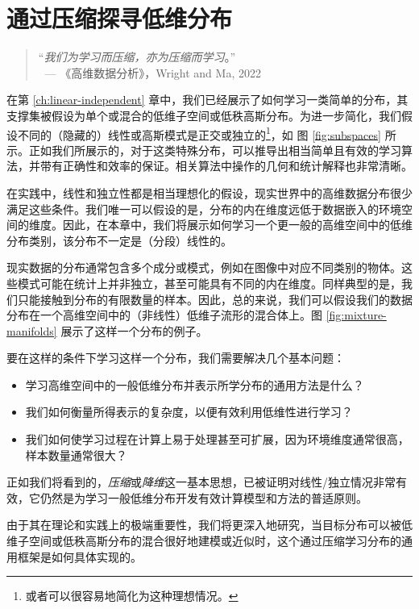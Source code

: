 \documentclass[../../book-main_zh.tex]{subfiles}
\begin{document}
\chapter{通过压缩探寻低维分布}
\label{ch:compression}\label{ch:general-distribution}

\begin{quote}
	\hfill    “{\em 我们为学习而压缩，亦为压缩而学习}。”\\
	$~$ \hfill --- 《高维数据分析》，Wright and Ma, 2022
\end{quote}
\vspace{5mm}

在第 \ref{ch:linear-independent} 章中，我们已经展示了如何学习一类简单的分布，其支撑集被假设为单个或混合的低维子空间或低秩高斯分布。为进一步简化，我们假设不同的（隐藏的）线性或高斯模式是正交或独立的\footnote{或者可以很容易地简化为这种理想情况。}，如 图 \ref{fig:subspaces} 所示。正如我们所展示的，对于这类特殊分布，可以推导出相当简单且有效的学习算法，并带有正确性和效率的保证。相关算法中操作的几何和统计解释也非常清晰。

在实践中，线性和独立性都是相当理想化的假设，现实世界中的高维数据分布很少满足这些条件。我们唯一可以假设的是，分布的内在维度远低于数据嵌入的环境空间的维度。因此，在本章中，我们将展示如何学习一个更一般的高维空间中的低维分布类别，该分布不一定是（分段）线性的。

现实数据的分布通常包含多个成分或模式，例如在图像中对应不同类别的物体。这些模式可能在统计上并非独立，甚至可能具有不同的内在维度。同样典型的是，我们只能接触到分布的有限数量的样本。因此，总的来说，我们可以假设我们的数据分布在一个高维空间中的（非线性）低维子流形的混合体上。图 \ref{fig:mixture-manifolds} 展示了这样一个分布的例子。

要在这样的条件下学习这样一个分布，我们需要解决几个基本问题：
\begin{itemize}
	\item 学习高维空间中的一般低维分布并表示所学分布的通用方法是什么？
	\item 我们如何衡量所得表示的复杂度，以便有效利用低维性进行学习？
	\item 我们如何使学习过程在计算上易于处理甚至可扩展，因为环境维度通常很高，样本数量通常很大？
\end{itemize}
正如我们将看到的，{\em 压缩}或{\em 降维}这一基本思想，已被证明对线性/独立情况非常有效，它仍然是为学习一般低维分布开发有效计算模型和方法的普适原则。

由于其在理论和实践上的极端重要性，我们将更深入地研究，当目标分布可以被低维子空间或低秩高斯分布的混合很好地建模或近似时，这个通过压缩学习分布的通用框架是如何具体实现的。
\end{document}
